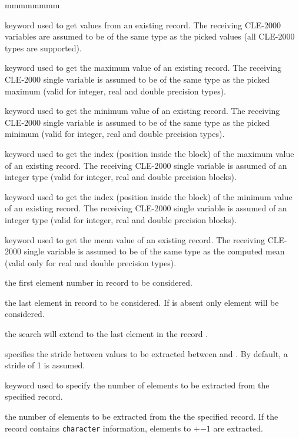 \begin{ListeDeDescription}{mmmmmmmm}
\item[\moc{GETVAL}] keyword used to get values from an existing record.
The receiving CLE-2000 variables are assumed to be of the same type as the
picked values (all CLE-2000 types are supported).

\item[\moc{MAXVAL}] keyword used to get the maximum value of an existing
record. The receiving CLE-2000 single variable is assumed to be of the same type
as the  picked maximum (valid for integer, real and double precision types).

\item[\moc{MINVAL}] keyword used to get the minimum value of an existing
record.
The receiving CLE-2000 single variable is assumed to be of the same type as the
picked minimum (valid for integer, real and double precision types).

\item[\moc{INDMAX}] keyword used to get the index (position inside the block)
of the maximum value of an existing
record.
The receiving CLE-2000 single variable is assumed of an integer type
(valid for integer, real and double precision blocks).

\item[\moc{INDMIN}] keyword used to get the index (position inside the block)
of the minimum value of an existing
record.
The receiving CLE-2000 single variable is assumed of an integer type
(valid for integer, real and double precision blocks).

\item[\moc{MEAN}] keyword used to get the mean value of an existing
record.
The receiving CLE-2000 single variable is assumed to be of the same type as the
computed mean (valid only for real and double precision types).

\item[\dusa{index1}] the first element number in record  to be
considered.

\item[\dusa{index2}] the last element in record  to be
considered. If  is absent only element  will be
considered.

\item[\moc{*}] the search will extend to the last
element in the record .

\item[\dusa{index3}] specifies the stride between
values to be extracted between  and . By default, a
stride of 1 is assumed.

\item[\moc{NVAL}] keyword used to specify the number of elements to be
extracted from the specified record.

\item[\dusa{neval}] the number of  elements to be extracted from
the the specified record. If the record contains {\tt character}
information, elements
 to
$+$$-1$ are extracted.

\end{ListeDeDescription}

